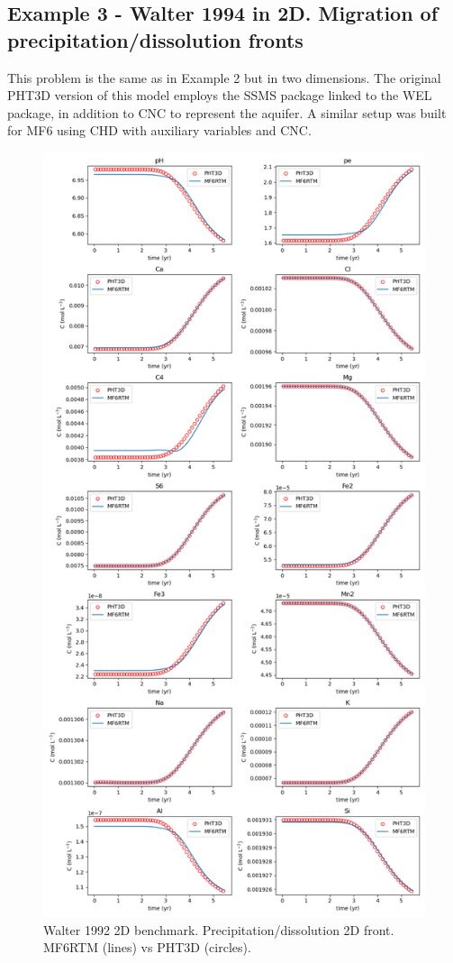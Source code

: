 \documentclass{article}
\begin{document}
\subsection{Example 3 - Walter 1994 in 2D. Migration of precipitation/dissolution fronts}
This problem is the same as in Example 2 but in two dimensions. The original PHT3D version of this model employs the SSMS package linked to the WEL package, in addition to CNC to represent the aquifer. A similar setup was built for MF6 using CHD with auxiliary variables and CNC.
\begin{figure}[H]
\centering

    \includegraphics[width=0.8\linewidth]{figures/ex3.png}
\caption{Walter 1992 2D benchmark. Precipitation/dissolution 2D front. MF6RTM (lines) vs PHT3D (circles).}
\label{fig:ex3_1}
\end{figure}
\end{document}
